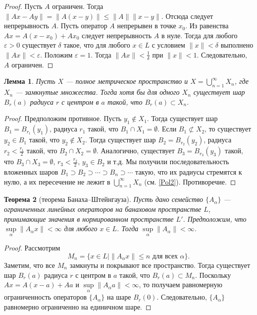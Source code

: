 \documentclass[12pt, titlepage, oneside]{amsbook}
\newtheorem{theorem}{Теорема}[chapter]
\newtheorem{lemma}[theorem]{Лемма}
\theoremstyle{definition}
\theoremstyle{remark}
\begin{document}
\begin{proof}
	Пусть $A$ ограничен. Тогда $\|Ax-Ay\|=\|A(x-y)\|\leq\|A\|\|x-y\|$. Отсюда следует непрерывность $A$. Пусть оператор $A$ непрерывен в точке $x_0$. Из равенства $Ax=A(x-x_0)+A x_0$ следует непрерывность $A$ в нуле. Тогда для любого $\varepsilon>0$ существует $\delta$ такое, что для любого $x\in L$ с условием $\|x\|<\delta$ выполнено $\|Ax\|<\varepsilon$. Положим $\varepsilon=1$. Тогда $\|Ax\|<\frac{1}{\delta}$ при $\|x\|<1$. Следовательно, $A$ ограничен.
\end{proof}

\begin{lemma}
	\label{BerBan} Пусть $X$ --- полное метрическое пространство и $X=\bigcup\limits_{n=1}^{\infty} X_n$, где $X_n$ --- замкнутые множества. Тогда хотя бы для одного $X_n$ существует шар $B_r(a)$ радиуса $r$ с центром в $a$ такой, что $B_r(a)\subset X_n$.
\end{lemma}

\begin{proof}
	Предположим противное. Пусть $y_1\not\in X_1$. Тогда существует шар $B_1=B_{r_1}(y_1)$, радиуса $r_1$ такой, что $B_1\cap X_1=\emptyset$. Если $B_1\not\subset X_2$, то существует $y_2\in B_1$ такой, что $y_2\not\in X_2$. Тогда существует шар $B_2=B_{r_2}(y_2)$, радиуса $r_2<\frac{r_1}{2}$ такой, что $B_2\cap X_2=\emptyset$. Аналогично, существует $B_3=B_{r_3}(y_3)$ такой, что $B_3\cap X_3=\emptyset$, $r_3<\frac{r_2}{2}$, $y_3\in B_2$ и т.д. Мы получили последовательность вложенных шаров $B_1\supset B_2\supset\cdots\supset B_n\supset\cdots$ такую, что их радиусы стремятся к нулю, а их пересечение не лежит в $\bigcup\limits_{n=1}^{\infty} X_n$ (см. \ref{Pol2}). Противоречие.
\end{proof}

\begin{theorem}[теорема Банаха--Штейнгауза]
	\label{Ban-Sh}
	Пусть дано семейство $\{A_{\alpha}\}$ --- ограниченных линейных операторов на банаховом пространстве $L$, принимающие значения в нормированном пространстве $L'$. Предположим, что $\sup\limits_{\alpha}\|A_{\alpha}x\|<\infty$ для любого $x\in L$. Тогда $\sup\limits_{\alpha}\|A_{\alpha}\|<\infty$.
\end{theorem}

\begin{proof}
	Рассмотрим $$M_n=\{x\in L\mid \|A_{\alpha}x\|\leq n\text{ для всех $\alpha$}\}.$$ Заметим, что все $M_n$ замкнуты и покрывают все пространство. Тогда существует шар $B_r(a)$ радиуса $r$ с центром в $a$ такой, что $B_r(a)\subset M_n$. Поскольку $Ax=A(x-a)+Aa$ и $\sup\limits_{\alpha}\|A_{\alpha}a\|<\infty$, то получаем равномерную ограниченность операторов $\{A_{\alpha}\}$ на шаре $B_r(0)$. Следовательно, $\{A_{\alpha}\}$ равномерно ограниченно на единичном шаре.
\end{proof}
\end{document}
